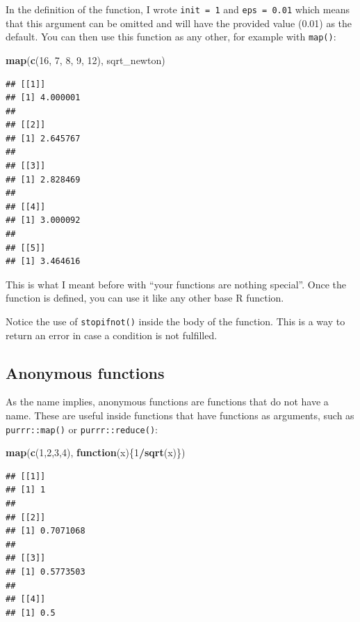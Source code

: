 \documentclass[]{gitbook}
\newenvironment{Shaded}{\begin{snugshade}}{\end{snugshade}}
\newcommand{\ControlFlowTok}[1]{\textcolor[rgb]{0.13,0.29,0.53}{\textbf{#1}}}
\newcommand{\DecValTok}[1]{\textcolor[rgb]{0.00,0.00,0.81}{#1}}
\newcommand{\KeywordTok}[1]{\textcolor[rgb]{0.13,0.29,0.53}{\textbf{#1}}}
\newcommand{\NormalTok}[1]{#1}
\newcommand{\OperatorTok}[1]{\textcolor[rgb]{0.81,0.36,0.00}{\textbf{#1}}}
\theoremstyle{definition}
\theoremstyle{definition}
\theoremstyle{definition}
\theoremstyle{remark}
\begin{document}
In the definition of the function, I wrote \texttt{init\ =\ 1} and
\texttt{eps\ =\ 0.01} which means that this argument can be omitted and
will have the provided value (0.01) as the default. You can then use
this function as any other, for example with \texttt{map()}:

\begin{Shaded}
\begin{Highlighting}[]
\KeywordTok{map}\NormalTok{(}\KeywordTok{c}\NormalTok{(}\DecValTok{16}\NormalTok{, }\DecValTok{7}\NormalTok{, }\DecValTok{8}\NormalTok{, }\DecValTok{9}\NormalTok{, }\DecValTok{12}\NormalTok{), sqrt_newton)}
\end{Highlighting}
\end{Shaded}

\begin{verbatim}
## [[1]]
## [1] 4.000001
## 
## [[2]]
## [1] 2.645767
## 
## [[3]]
## [1] 2.828469
## 
## [[4]]
## [1] 3.000092
## 
## [[5]]
## [1] 3.464616
\end{verbatim}

This is what I meant before with ``your functions are nothing special''.
Once the function is defined, you can use it like any other base R
function.

Notice the use of \texttt{stopifnot()} inside the body of the function.
This is a way to return an error in case a condition is not fulfilled.

\hypertarget{anonymous-functions}{%
\subsection{Anonymous functions}\label{anonymous-functions}}

As the name implies, anonymous functions are functions that do not have
a name. These are useful inside functions that have functions as
arguments, such as \texttt{purrr::map()} or \texttt{purrr::reduce()}:

\begin{Shaded}
\begin{Highlighting}[]
\KeywordTok{map}\NormalTok{(}\KeywordTok{c}\NormalTok{(}\DecValTok{1}\NormalTok{,}\DecValTok{2}\NormalTok{,}\DecValTok{3}\NormalTok{,}\DecValTok{4}\NormalTok{), }\ControlFlowTok{function}\NormalTok{(x)\{}\DecValTok{1}\OperatorTok{/}\KeywordTok{sqrt}\NormalTok{(x)\})}
\end{Highlighting}
\end{Shaded}

\begin{verbatim}
## [[1]]
## [1] 1
## 
## [[2]]
## [1] 0.7071068
## 
## [[3]]
## [1] 0.5773503
## 
## [[4]]
## [1] 0.5
\end{verbatim}
\end{document}
